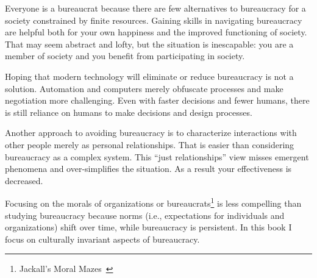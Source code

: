 Everyone is a bureaucrat because there are few alternatives to bureaucracy for a society constrained by finite resources. Gaining skills in navigating bureaucracy are helpful both for your own happiness and the improved functioning of society. That may seem abstract and lofty, but the situation is inescapable: you are a member of society and you benefit from participating in society. 

Hoping that modern technology will eliminate or reduce bureaucracy is not a solution. Automation and computers merely obfuscate processes and make negotiation more challenging. Even with faster decisions and fewer humans, there is still reliance on humans to make decisions and design processes.

Another approach to avoiding bureaucracy is to characterize interactions with other people merely as personal relationships. That is easier than considering bureaucracy as a complex system.
This ``just relationships'' view misses emergent phenomena and over-simplifies the situation. As a result your effectiveness is decreased.






Focusing on the morals of organizations or bureaucrats\footnote{Jackall's Moral Mazes~\cite{2009_Jackall}} is less compelling than studying bureaucracy because norms (i.e., expectations for individuals and organizations) shift over time, while bureaucracy is persistent. 
In this book I focus on culturally invariant aspects of bureaucracy. 

